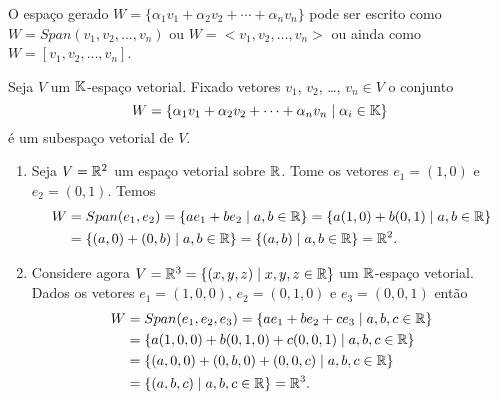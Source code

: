 \begin{notacao}
  O espaço gerado $W = \{\alpha_1v_1 + \alpha_2v_2 + \cdots + \alpha_nv_n\}$ pode ser escrito como $W = Span(v_1, v_2, \dots, v_n)$ ou $W = <v_1, v_2, \dots, v_n>$ ou ainda como $W = [v_1, v_2, \dots, v_n]$.
\end{notacao}

\begin{proposicao}
  Seja $V$ um $\mathbb{K}$-espaço vetorial. Fixado vetores $v_1$, $v_2$, \dots, $v_n \in V$ o conjunto
  \[
    W = \{\alpha_1v_1 + \alpha_2v_2 + \cdots + \alpha_nv_n \mid \alpha_i \in \mathbb{K}\}
  \]
  é um subespaço vetorial de $V$.
\end{proposicao}

\begin{exemplos}\label{exemplosespacosgerados}
    \begin{enumerate}
        \item\label{exemplor2} Seja $V = \mathbb{R}^2$ um espaço vetorial sobre $\mathbb{R}$. Tome os vetores $e_1 = (1,0)$ e $e_2 = (0, 1)$. Temos
        \begin{align*}
            W &= Span(e_1, e_2) = \{ae_1 + be_2 \mid a, b \in \mathbb{R}\} = \{a(1, 0) + b(0, 1) \mid a, b \in \mathbb{R}\} \\ &= \{(a, 0) + (0, b) \mid a, b \in \mathbb{R}\} = \{(a, b) \mid a, b \in \mathbb{R}\} = \mathbb{R}^2.
        \end{align*}

        \item\label{exemplor3} Considere agora $V = \mathbb{R}^3 = \{(x , y, z) \mid x, y, z \in \mathbb{R}\}$ um $\mathbb{R}$-espaço vetorial. Dados os vetores $e_1 = (1,0, 0)$, $e_2 = (0, 1, 0)$ e $e_3 = (0, 0, 1)$ então
        \begin{align*}
            W &= Span(e_1, e_2, e_3) = \{ae_1 + be_2 + ce_3 \mid a, b, c \in \mathbb{R}\} \\ &= \{a(1, 0, 0) + b(0, 1, 0) + c(0, 0, 1) \mid a, b, c \in \mathbb{R}\} \\ &= \{(a, 0, 0) + (0, b, 0) + (0, 0, c) \mid a, b, c \in \mathbb{R}\} \\ &= \{(a, b, c) \mid a, b, c \in \mathbb{R}\} = \mathbb{R}^3.
        \end{align*}


\end{enumerate}
\end{exemplos}
